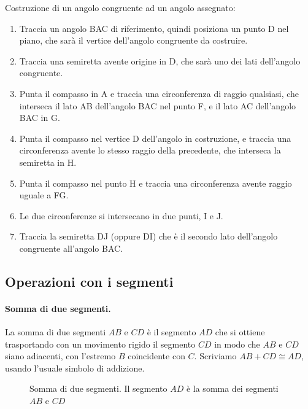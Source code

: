 \begin{procedura}
 Costruzione di un angolo congruente ad un angolo assegnato:
\begin{enumerate} [nosep]
\item 
Traccia un angolo BAC di riferimento, quindi posiziona un punto D nel piano, 
che sarà il vertice dell'angolo congruente da costruire.
\item 
Traccia una semiretta avente origine in D, che sarà uno dei lati dell'angolo 
congruente.
\item 
Punta il compasso in A e traccia una circonferenza di raggio qualsiasi, che 
interseca il lato AB dell'angolo BAC nel punto F, e il lato AC dell'angolo BAC 
in G.
\item 
Punta il compasso nel vertice D dell'angolo in costruzione, e traccia una 
circonferenza avente lo stesso raggio della precedente, che interseca la 
semiretta in H.
\item 
Punta il compasso nel punto H e traccia una circonferenza avente raggio 
uguale a FG.
\item 
Le due circonferenze si intersecano in due punti, I e J.
\item 
Traccia la semiretta DJ (oppure DI) che è il secondo lato dell'angolo 
congruente all'angolo BAC.
\end{enumerate}
\end{procedura}


\subsection{Operazioni con i segmenti}

\paragraph{Somma di due segmenti.} La somma di due segmenti $AB$ e 
$CD$ è il segmento $AD$ che si ottiene trasportando con un movimento 
rigido il segmento $CD$ in modo che $AB$ e $CD$ siano adiacenti, con 
l'estremo $B$ coincidente con $C$. Scriviamo $AB + CD \cong AD$, 
usando l'usuale simbolo di addizione.


\begin{inaccessibleblock}
 \begin{figure}[htb]
\centering
\caption{Somma di due segmenti. Il segmento $AD$ è la somma dei 
segmenti $AB$ e $CD$}
\end{figure}
\end{inaccessibleblock}

